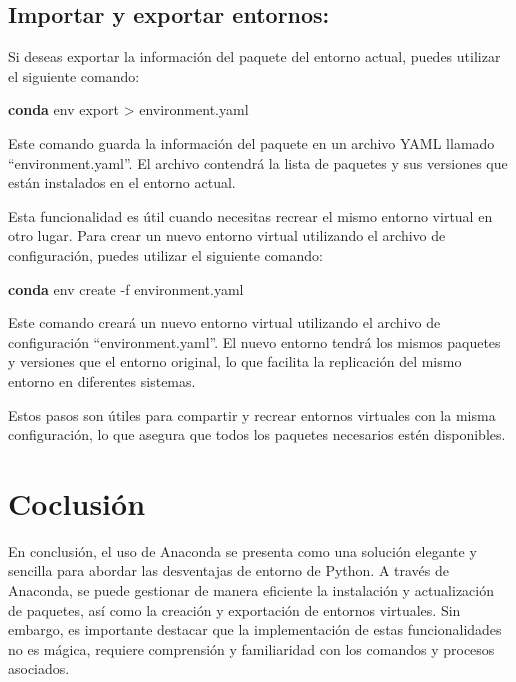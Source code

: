 \documentclass[
  a4paper,
]{article}
\newenvironment{Shaded}{}{}
\newcommand{\AttributeTok}[1]{\textcolor[rgb]{0.84,0.23,0.29}{#1}}
\newcommand{\ExtensionTok}[1]{\textcolor[rgb]{0.84,0.23,0.29}{\textbf{#1}}}
\newcommand{\NormalTok}[1]{\textcolor[rgb]{0.14,0.16,0.18}{#1}}
\newcommand{\OperatorTok}[1]{\textcolor[rgb]{0.14,0.16,0.18}{#1}}
\begin{document}
\hypertarget{importar-y-exportar-entornos}{%
\subsection{Importar y exportar
entornos:}\label{importar-y-exportar-entornos}}

Si deseas exportar la información del paquete del entorno actual, puedes
utilizar el siguiente comando:

\begin{Shaded}
\begin{Highlighting}[]
\ExtensionTok{conda}\NormalTok{ env export }\OperatorTok{\textgreater{}}\NormalTok{ environment.yaml}
\end{Highlighting}
\end{Shaded}

Este comando guarda la información del paquete en un archivo YAML
llamado ``environment.yaml''. El archivo contendrá la lista de paquetes
y sus versiones que están instalados en el entorno actual.

Esta funcionalidad es útil cuando necesitas recrear el mismo entorno
virtual en otro lugar. Para crear un nuevo entorno virtual utilizando el
archivo de configuración, puedes utilizar el siguiente comando:

\begin{Shaded}
\begin{Highlighting}[]
\ExtensionTok{conda}\NormalTok{ env create }\AttributeTok{{-}f}\NormalTok{ environment.yaml}
\end{Highlighting}
\end{Shaded}

Este comando creará un nuevo entorno virtual utilizando el archivo de
configuración ``environment.yaml''. El nuevo entorno tendrá los mismos
paquetes y versiones que el entorno original, lo que facilita la
replicación del mismo entorno en diferentes sistemas.

Estos pasos son útiles para compartir y recrear entornos virtuales con
la misma configuración, lo que asegura que todos los paquetes necesarios
estén disponibles.

\hypertarget{coclusiuxf3n}{%
\section{Coclusión}\label{coclusiuxf3n}}

En conclusión, el uso de Anaconda se presenta como una solución elegante
y sencilla para abordar las desventajas de entorno de Python. A través
de Anaconda, se puede gestionar de manera eficiente la instalación y
actualización de paquetes, así como la creación y exportación de
entornos virtuales. Sin embargo, es importante destacar que la
implementación de estas funcionalidades no es mágica, requiere
comprensión y familiaridad con los comandos y procesos asociados.
\end{document}
